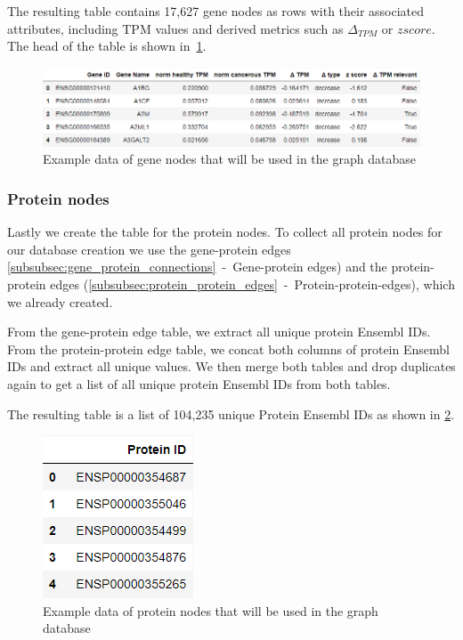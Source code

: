 The resulting table contains 17,627 gene nodes as rows with their associated attributes,
including TPM values and derived metrics such as $\Delta_{TPM}$ or $z score$.
The head of the table is shown in~\cref{fig:03_02_df_gene_nodes}.

\begin{figure}[h]
    \centering
    \includegraphics[height=\dfheight]{figures/03_02_gene_nodes}
    \caption{Example data of gene nodes that will be used in the graph database}
    \label{fig:03_02_df_gene_nodes}
\end{figure}


\subsubsection*{Protein nodes} \label{subsubsec:protein_nodes}
Lastly we create the table for the protein nodes.
To collect all protein nodes for our database creation we use the gene-protein edges \cref{subsubsec:gene_protein_connections}~-~Gene-protein edges)
and the protein-protein edges (\cref{subsubsec:protein_protein_edges}~-~Protein-protein-edges), which we already created.

From the gene-protein edge table, we extract all unique protein Ensembl IDs.
From the protein-protein edge table, we concat both columns of protein Ensembl IDs and extract all unique values.
We then merge both tables and drop duplicates again to get a list of all unique protein Ensembl IDs from both tables.

The resulting table is a list of 104,235 unique Protein Ensembl IDs as shown in \cref{fig:03_02_df_protein_nodes}.


\begin{figure}[h]
    \centering
    \includegraphics[height=\dfheight]{figures/03_02_protein_nodes}
    \caption{Example data of protein nodes that will be used in the graph database}
    \label{fig:03_02_df_protein_nodes}
\end{figure}